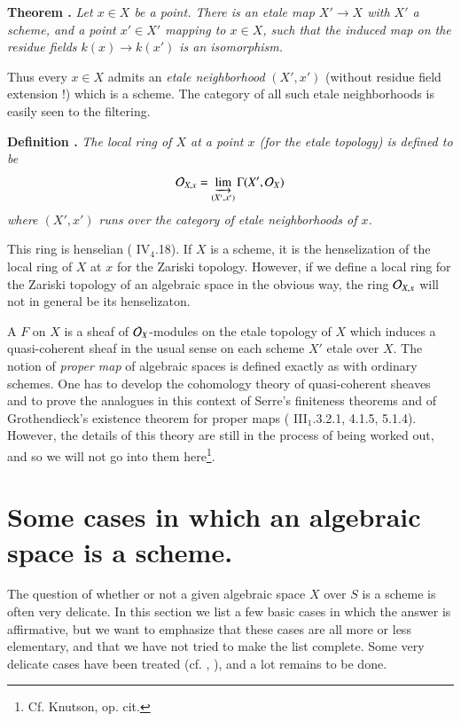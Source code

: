 \medskip
\noindent
{\bf Theorem .\label{art02-thm2.4}}
{\em Let $x\in X$ be a point. There is an etale map $X'\to X$ with $X'$ a scheme, and a point $x'\in X'$ mapping to $x\in X$, such that the induced map on the residue fields $k(x)\to k(x')$ is an isomorphism.}
\smallskip

Thus every $x\in X$ admits an {\em etale neighborhood} $(X',x')$ (without residue field extension !) which is a scheme. The category of all such etale neighborhoods is easily seen to the filtering.

\medskip
\noindent
{\bf Definition .\label{art02-defi2.5}}
{\em The local ring of $X$ at a point $x$ (for the etale topology) is defined to be}
$$
\mathcal{O}_{X,x}=\varinjlim\limits_{(X',x')}\Gamma (X',\mathcal{O}_{X})
$$
{\em where $(X',x')$ runs over the category of etale neighborhoods of $x$.}
\smallskip

This ring is henselian (\cite{art02-key8} IV$_{4}$.18). If $X$ is a scheme, it is the henseli\-zation of the local ring of $X$ at $x$ for the Zariski topology. However, if we define a local ring for the Zariski topology of an algebraic space in the obvious way, the ring $\mathcal{O}_{X,x}$ will not in general be its henselizaton.

\eject

A $F$ on $X$ is a sheaf of $\mathcal{O}_{X}$-modules on the etale topology of $X$ which induces a quasi-coherent sheaf in the usual sense on each scheme $X'$ etale over $X$. The notion of {\em proper map} of algebraic spaces is defined exactly as with ordinary schemes. One has to develop the cohomology theory of quasi-coherent sheaves and to prove the analogues in this context of Serre's finiteness theorems and of Grothendieck's existence theorem for proper maps (\cite{art02-key8} III$_{1}$.3.2.1, 4.1.5, 5.1.4). However, the details of this theory are still in the process of being worked out, and so we will not go into them here\footnote{Cf. Knutson, op. cit.}.

\section{Some cases in which an algebraic space is a scheme.}\label{art02-sec3}

The question of whether or not a given algebraic space $X$ over $S$ is a scheme is often very delicate. In this section we list a few basic cases in which the answer is affirmative, but we want to emphasize that these cases are all more or less elementary, and that we have not tried to make the list complete. Some very delicate cases have been treated (cf. \cite{art02-key25}, \cite{art02-key30}), and a lot remains to be done.

